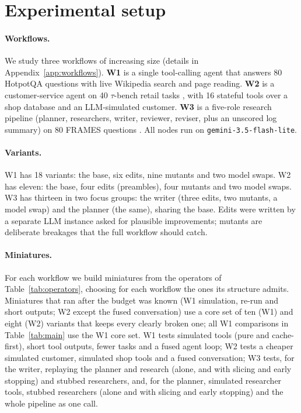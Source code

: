 \section{Experimental setup}
\label{sec:setup}

\paragraph{Workflows.}
We study three workflows of increasing size (details in Appendix~\ref{app:workflows}).
\textbf{W1} is a single tool-calling agent that answers 80 HotpotQA questions
\citep{yang2018hotpotqa} with live Wikipedia search and page reading. \textbf{W2} is a
customer-service agent on 40 $\tau$-bench retail tasks \citep{yao2024taubench}, with 16 stateful
tools over a shop database and an LLM-simulated customer. \textbf{W3} is a five-role research
pipeline (planner, researchers, writer, reviewer, reviser, plus an unscored log summary) on 80
FRAMES questions \citep{krishna2024fact}. All nodes run on \texttt{gemini-3.5-flash-lite}.

\paragraph{Variants.}
W1 has 18 variants: the base, six edits, nine mutants and two model swaps. W2 has eleven: the
base, four edits (preambles), four mutants and two model swaps. W3 has thirteen in two focus
groups: the writer (three edits, two mutants, a model swap) and the planner (the same), sharing the
base. Edits were written by a separate LLM instance asked for plausible improvements; mutants are
deliberate breakages that the full workflow should catch.

\paragraph{Miniatures.}
For each workflow we build miniatures from the operators of Table~\ref{tab:operators}, choosing
for each workflow the ones its structure admits. Miniatures that ran after the budget
was known (W1 simulation, re-run and short outputs; W2 except the fused conversation) use a core
set of ten (W1) and eight (W2) variants that keeps every clearly broken one; all W1 comparisons in
Table~\ref{tab:main} use the W1 core set.
W1 tests simulated tools (pure and cache-first), short tool outputs, fewer tasks and a fused
agent loop; W2 tests a cheaper simulated customer, simulated shop tools and a fused conversation; W3
tests, for the writer, replaying the planner and research (alone, and with slicing and early
stopping) and stubbed researchers, and, for the planner, simulated researcher tools, stubbed
researchers (alone and with slicing and early stopping) and the whole pipeline as one call.

